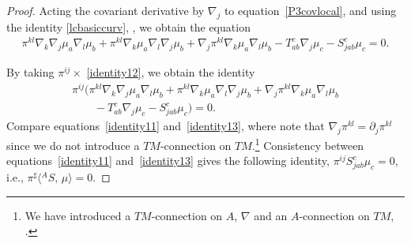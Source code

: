 \documentclass[10pt,a4paper]{article}
\numberwithin{equation}{section}
\newcommand{\bracket}[2]{\langle #1,\,#2\rangle}
\newcommand{\nablabas}{{{}^A \nabla}^{\mathrm{bas}}}
\newcommand{\anabla}{{{}^A \nabla}}
\begin{document}
\begin{proof}
Acting the covariant derivative by $\nabla_j$ to equation~\eqref{P3covlocal},
and using the identity \eqref{lcbasiccurv},
,
we obtain the equation
\begin{gather}
 \pi^{kl} \nabla_k \nabla_j \mu_a \nabla_l \mu_b
+ \pi^{kl} \nabla_k \mu_a \nabla_l \nabla_j \mu_b
+ \nabla_j \pi^{kl} \nabla_k \mu_a \nabla_l \mu_b
- T_{ab}^c \nabla_j \mu_c
- S_{jab}^c \mu_c =0.
\label{identity12}
\end{gather}

By taking $\pi^{ij} \times$ \eqref{identity12},
we obtain the identity
\begin{gather}
 \pi^{ij}\bigl(\pi^{kl} \nabla_k \nabla_j \mu_a \nabla_l \mu_b
+ \pi^{kl} \nabla_k \mu_a \nabla_l \nabla_j \mu_b
+ \nabla_j \pi^{kl} \nabla_k \mu_a \nabla_l \mu_b\nonumber\\
\qquad
{}- T_{ab}^c \nabla_j \mu_c
- S_{jab}^c \mu_c\bigr) =0.
\label{identity13}
\end{gather}
Compare equations~\eqref{identity11} and~\eqref{identity13},
where note that $\nabla_j \pi^{kl} = \partial_j \pi^{kl}$
since we do not introduce a $TM$-connection on $TM$.\footnote{We have introduced a $TM$-connection on $A$, $\nabla$ and
an $A$-connection on $TM$, \smash{$\anabla = \nablabas$}.}
Consistency between equations~\eqref{identity11} and~\eqref{identity13}
gives the following identity,
$\pi^{ij} S_{jab}^c \mu_c =0$,
i.e.,
$ \pi^{\sharp} \bracket{{}^AS}{\mu} =0$.
\end{proof}
\end{document}
